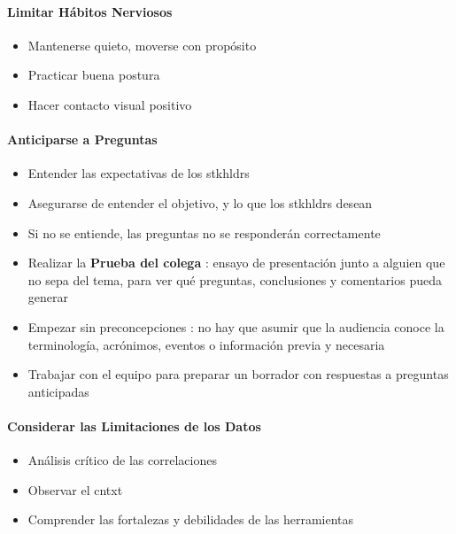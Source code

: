 \paragraph{Limitar Hábitos Nerviosos}
\begin{itemize}
    \item {Mantenerse quieto, moverse con propósito}
    \item {Practicar buena postura}
    \item {Hacer contacto visual positivo}
\end{itemize}

\paragraph{Anticiparse a Preguntas}
\begin{itemize}
    \item {Entender las expectativas de los \gls{stkhldrs}}
    \item {Asegurarse de entender el objetivo, y lo que los \gls{stkhldrs} desean}
    \item {Si no se entiende, las preguntas no se responderán correctamente}
    \item {Realizar la \textbf{Prueba del colega} : ensayo de presentación junto a alguien que no sepa del tema, para ver qué preguntas, conclusiones y comentarios pueda generar}
    \item {Empezar sin preconcepciones : no hay que asumir que la audiencia conoce la terminología, acrónimos, eventos o información previa y necesaria}
    \item {Trabajar con el equipo para preparar un borrador con respuestas a preguntas anticipadas}
\end{itemize}

\paragraph{Considerar las Limitaciones de los Datos}
\begin{itemize}
    \item {Análisis crítico de las correlaciones}
    \item {Observar el \gls{cntxt}}
    \item {Comprender las fortalezas y debilidades de las herramientas}
\end{itemize}

